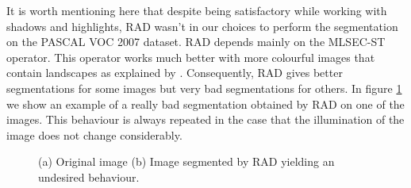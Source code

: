 \documentclass[twoside,11pt]{article}
\begin{document}
It is worth mentioning here that despite being satisfactory while working with
shadows and highlights, RAD wasn't in our choices to perform the segmentation on
the PASCAL VOC 2007 dataset. RAD depends mainly on the MLSEC-ST operator. This
operator works much better with more colourful images that contain landscapes as
explained by \cite{crestes}. Consequently, RAD gives better segmentations for
some images but very bad segmentations for others. In figure \ref{fig:bad_seg_RAD}
we show an example of a really bad segmentation obtained by RAD on one of the images.
This behaviour is always repeated in the case that the illumination of the image
does not change considerably.

\begin{figure}[!t]
\centering
{}
\caption{(a) Original image (b) Image segmented by RAD yielding an undesired
behaviour.}
\label{fig:bad_seg_RAD}
\end{figure}
\end{document}
